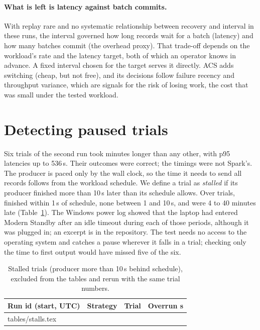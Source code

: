 \documentclass[10pt,twocolumn]{article}
\makeatletter
\def\StallRows{\@@input tables/stalls.tex }
\makeatother
\begin{document}
\paragraph{What is left is latency against batch commits.}
With replay rare and no systematic relationship between recovery and interval
in these runs, the
interval governed how long records wait for a batch (latency) and how many
batches commit (the overhead proxy). That trade-off depends on the workload's
rate and the latency target, both of which an operator knows in advance. A
fixed interval chosen for the target serves it directly. ACS adds switching
(cheap, but not free), and its decisions follow failure recency and throughput
variance, which are signals for the risk of losing work, the cost that was
small under the tested workload.

\section{Detecting paused trials}
\label{sec:stalls}

Six trials of the second run took minutes longer than any other, with p95
latencies up to 536\,s. Their outcomes were correct; the timings were not
Spark's. The producer is paced only by the wall clock, so the time it needs to
send all records follows from the workload schedule. We define a trial as
\emph{stalled} if its producer finished more than 10\,s later than its schedule
allows. Over \OverrunTotal{} trials, \OverrunUnderOne{} finished within 1\,s of
schedule, none between 1 and 10\,s, and \ACSStalled{} were 4 to 40 minutes late
(Table~\ref{tab:stalls}). The Windows power log showed that the laptop had
entered Modern Standby after an idle timeout during each of those periods,
although it was plugged in; an excerpt is in the repository. The test needs no
access to the operating system and catches a pause wherever it falls in a
trial; checking only the time to first output would have missed five of the six.

\begin{table}[t]
\centering\small
\caption{Stalled trials (producer more than 10\,s behind schedule), excluded
from the tables and rerun with the same trial numbers.}
\label{tab:stalls}
\begin{tabular}{@{}llrr@{}}
\toprule
Run id (start, UTC) & Strategy & Trial & Overrun s \\
\midrule
\StallRows
\bottomrule
\end{tabular}
\end{table}
\end{document}
